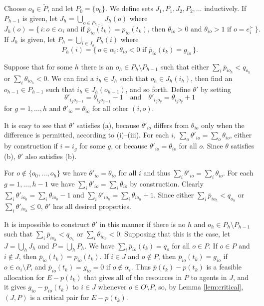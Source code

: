 \documentclass[12pt, A4paper]{article}
\theoremstyle{definition}
\newcommand{\tP}{{\tilde P}}
\newcommand{\barp}{\overline{p}}
\begin{document}
Choose $o_0 \in \tP$, and let $P_0 = \{o_0\}$.  We define sets $J_1,P_1, J_2, P_2, \ldots$ inductively.  If $P_{h-1}$ is given, let $J_h = \bigcup_{o \in P_{h-1}} J_h(o)$ where 
$$J_h(o) = \{\, i : \text{$o \in \alpha_i$ and if $\barp_{io}(t_k) = p_{io}(t_k)$, then  $\theta_{io} > 0$ and $\theta_{io} > 1$ if $o = e^\succ_i$} \,\}.$$
If $J_h$ is given, let $P_h = \bigcup_{i \in J_h} P_h(i)$ where
$$P_h(i) = \{\, o \in \alpha_i : \text{$\theta_{io} < 0$ if $\barp_{io}(t_k) = g_{io}$} \,\}.$$

Suppose that for some $h$ there is an $o_h \in P_h \setminus P_{h-1}$ such that either $\sum_i \barp_{io_h} < q_{o_h}$ or $\sum_i \theta_{io_h} < 0$. We can find a $i_h \in J_h$ such that $o_h \in J_h(i_h)$,  then find an $o_{h-1} \in P_{h-1}$ such that $i_h \in J_h(o_{h-1})$, and so forth. Define $\theta'$ by setting $$\theta'_{i_go_{g-1}} = \theta_{i_go_{g-1}} - 1 \quad \text{and} \quad \theta'_{i_go_g} = \theta_{i_go_g} + 1$$ for $g = 1, \ldots, h$ and $\theta'_{io} = \theta_{io}$ for all other $(i,o)$.  

It is easy to see that $\theta'$ satisfies (a), because $\theta'_{io}$ differs from $\theta_{io}$ only when the difference is permitted, according to (i)--(iii).  For each $i$, $\sum_o \theta'_{io} = \sum_o \theta_{io}$, either by construction if $i = i_g$ for some $g$, or because $\theta'_{io} = \theta_{io}$ for all $o$.  Since $\theta$ satisfies (b), $\theta'$ also satisfies (b).

For $o \notin \{o_0, \ldots, o_h\}$ we have $\theta'_{io} = \theta_{io}$ for all $i$ and thus $\sum_i \theta'_{io} = \sum_i \theta_{io}$.  For each  $g = 1, \ldots, h-1$ we have $\sum_i \theta'_{io} = \sum_i \theta_{io}$ by construction.  Clearly $\sum_i \theta'_{io_0} = \sum_i \theta_{io_0} - 1$ and $\sum_i \theta'_{io_h} = \sum_i \theta_{io_h} + 1$.  Since either $\sum_i \barp_{io_h} < q_{o_h}$ or $\sum_i \theta'_{io_h} \le 0$, $\theta'$ has all desired properties.

It is impossible to construct $\theta'$ in this manner if there is no $h$ and $o_h \in P_h \setminus P_{h-1}$ such that $\sum_i \barp_{io_h} < q_{o_h}$ or $\sum_i \theta_{io_h} < 0$.  
Supposing that this is the case, let $J = \bigcup_h J_h$ and $P = \bigcup_h P_h$.  
We have $\sum_i \barp_{io}(t_k) = q_o$ for all $o \in P$.  If $o \in P$ and $i \notin J$, then $\barp_{io}(t_k) = p_{io}(t_k)$.  If $i \in J$ and $o \notin P$, then  $\barp_{io}(t_k) = g_{io}$ if $o \in \alpha_i \setminus P$, and $\barp_{io}(t_k) = g_{io} = 0$ if $o \notin \alpha_i$. Thus $\barp(t_k) - p(t_k)$ is a feasible allocation for $E - p(t_k)$ that gives all of the resources in $P$ to agents in $J$, and it gives $g_{io} - p_{io}(t_k)$ to $i \in J$ whenever $o \in O \setminus P$, so, by Lemma \ref{lem:critical}, $(J,P)$ is a critical pair for $E - p(t_k)$.  
\end{document}
